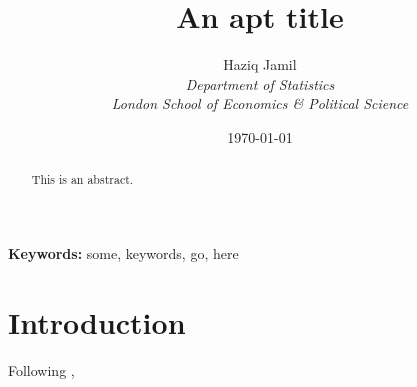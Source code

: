 \documentclass[english, 11pt]{article}\usepackage[]{graphicx}\usepackage[]{color}
\begin{document}


\title{An apt title}
\author{	Haziq Jamil\\
			\normalsize{\it{Department of Statistics}}\\
			\normalsize{\it{London School of Economics \& Political Science}}
}
\date{\normalsize\today}
\maketitle

\begin{abstract}
This is an abstract. \lipsum[1]
\end{abstract}

{\noindent\textbf{Keywords:} 
	some, keywords, go, here
}

\section{Introduction}
%

Following \cite{jamil2017},	\lipsum[2-3]
\end{document}
